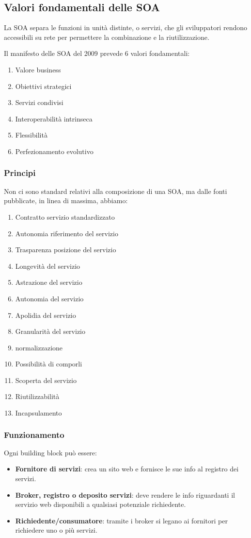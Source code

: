 \documentclass{report}
\begin{document}
\newpage
\subsection*{Valori fondamentali delle SOA}
La SOA separa le funzioni in unità distinte, o servizi, che gli sviluppatori rendono accessibili su rete per permettere la combinazione e la riutilizzazione.

\noindent
Il manifesto delle SOA del 2009 prevede 6 valori fondamentali:
\begin{enumerate}
    \item Valore business
    \item Obiettivi strategici
    \item Servizi condivisi
    \item Interoperabilità intrinseca
    \item Flessibilità
    \item Perfezionamento evolutivo
\end{enumerate}

\subsubsection*{Principi}
Non ci sono standard relativi alla composizione di una SOA, ma dalle fonti pubblicate, in linea di massima, abbiamo:
\begin{enumerate}
    \item Contratto servizio standardizzato
    \item Autonomia riferimento del servizio
    \item Trasparenza posizione del servizio
    \item Longevità del servizio
    \item Astrazione del servizio
    \item Autonomia del servizio
    \item Apolidia del servizio
    \item Granularità del servizio
    \item normalizzazione
    \item Possibilità di comporli
    \item Scoperta del servizio
    \item Riutilizzabilità
    \item Incapsulamento
\end{enumerate}

\subsubsection*{Funzionamento}
Ogni building block può essere:
\begin{itemize}
    \item \textbf{Fornitore di servizi}: crea un sito web e fornisce le sue info al registro dei servizi.
    \item \textbf{Broker, registro o deposito servizi}: deve rendere le info riguardanti il servizio web disponibili a qualsiasi potenziale richiedente.
    \item \textbf{Richiedente/consumatore}: tramite i broker si legano ai fornitori per richiedere uno o più servizi.
\end{itemize}
\end{document}
